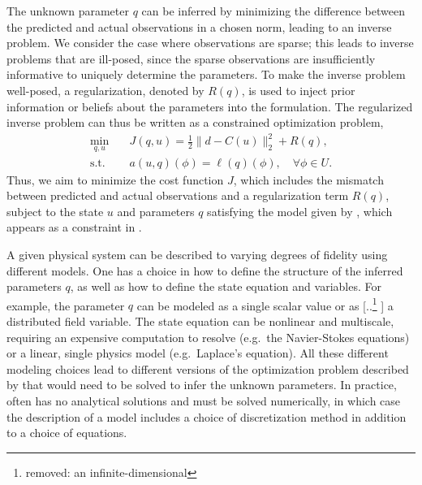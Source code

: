 \documentclass[review,sort&compress]{elsarticle}
\theoremstyle{plain} %
\theoremstyle{definition} %
\providecommand{\DIFaddtex}[1]{{\protect\color{blue} \sf #1}} %
\providecommand{\DIFdeltex}[1]{{\protect\color{red} [..\footnote{removed: #1} ]}} %
\providecommand{\DIFaddbegin}{} %
\providecommand{\DIFaddend}{} %
\providecommand{\DIFdelbegin}{} %
\providecommand{\DIFdelend}{} %
\providecommand{\DIFadd}[1]{\texorpdfstring{\DIFaddtex{#1}}{#1}} %
\providecommand{\DIFdel}[1]{\texorpdfstring{\DIFdeltex{#1}}{}} %
\newcommand{\DIFscaledelfig}{0.5}
\newlength{\DIFdelgraphicswidth} %
\newlength{\DIFdelgraphicsheight} %
\newcommand{\DIFaddincludegraphics}[2][]{{\color{blue}\fbox{\DIFOincludegraphics[#1]{#2}}}} %
\newcommand{\DIFdelincludegraphics}[2][]{%
\sbox{\DIFdelgraphicsbox}{\DIFOincludegraphics[#1]{#2}}%
\settoboxwidth{\DIFdelgraphicswidth}{\DIFdelgraphicsbox} %
\settoboxtotalheight{\DIFdelgraphicsheight}{\DIFdelgraphicsbox} %
\scalebox{\DIFscaledelfig}{%
\parbox[b]{\DIFdelgraphicswidth}{\usebox{\DIFdelgraphicsbox}\\[-\baselineskip] \rule{\DIFdelgraphicswidth}{0em}}\llap{\resizebox{\DIFdelgraphicswidth}{\DIFdelgraphicsheight}{%
\setlength{\unitlength}{\DIFdelgraphicswidth}%
\begin{picture}(1,1)%
\thicklines\linethickness{2pt} %
{\color[rgb]{1,0,0}\put(0,0){\framebox(1,1){}}}%
{\color[rgb]{1,0,0}\put(0,0){\line( 1,1){1}}}%
{\color[rgb]{1,0,0}\put(0,1){\line(1,-1){1}}}%
\end{picture}%
}\hspace*{3pt}}} %
} %
\DeclareRobustCommand{\DIFaddbegin}{\DIFOaddbegin \let\includegraphics\DIFaddincludegraphics} %
\DeclareRobustCommand{\DIFaddend}{\DIFOaddend \let\includegraphics\DIFOincludegraphics} %
\DeclareRobustCommand{\DIFdelbegin}{\DIFOdelbegin \let\includegraphics\DIFdelincludegraphics} %
\DeclareRobustCommand{\DIFdelend}{\DIFOaddend \let\includegraphics\DIFOincludegraphics} %
\begin{document}
The unknown parameter $q$ can be inferred by minimizing the difference between the predicted and actual observations in a chosen norm, leading to an inverse problem. We consider the case where observations are sparse; this leads to inverse problems that are ill-posed, since the sparse observations are insufficiently informative to uniquely determine the parameters. To make the inverse problem well-posed, a regularization, denoted by $R(q)$, is used to inject prior information or beliefs about the parameters into the formulation. The regularized inverse problem can thus be written as a constrained optimization problem,
%
\begin{subequations}
\label{eq:invOpt}
\begin{align}
\min\limits_{q,u} & \quad J(q,u)=\frac{1}{2}\|d-C(u)\|_2^2 + R(q), \label{eq:invOpt_obj} \\
\textrm{s.t. }& \quad a(u,q)(\phi)=\ell(q)(\phi),\quad\forall\phi\in U. \label{eq:invOpt_cons}
\end{align}
\end{subequations}
%
Thus, we aim to minimize the cost function $J$, which includes the mismatch between predicted and actual observations and a regularization term $R(q)$, subject to the state $u$ and parameters $q$ satisfying the model given by , which appears as a constraint in .

A given physical system can be described to varying degrees of fidelity using different models. One has a choice in how to define the structure of the inferred parameters $q$, as well as how to define the state equation and variables. For example, the parameter $q$ can be modeled as a single scalar value or as \DIFdelbegin \DIFdel{an infinite-dimensional }\DIFdelend \DIFaddbegin \DIFadd{a }\DIFaddend distributed field variable. The state equation can be nonlinear and multiscale, requiring an expensive computation to resolve (e.g.\ the Navier-Stokes equations) or a linear, single physics model (e.g.\ Laplace's equation). All these different modeling choices lead to different versions of the optimization problem described by  that would need to be solved to infer the unknown parameters. \DIFaddbegin \DIFadd{In practice,  often has no analytical solutions and must be solved numerically, in which case the description of a model includes a choice of discretization method in addition to a choice of equations.
}\DIFaddend 
\end{document}
